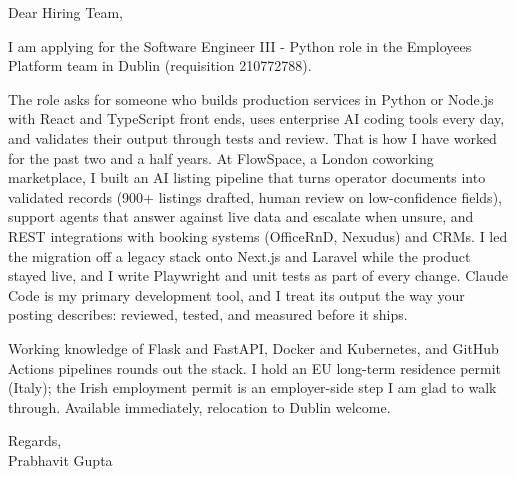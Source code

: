 \documentclass[a4paper,11pt]{article}
\begin{document}
Dear Hiring Team,

I am applying for the Software Engineer III - Python role in the Employees Platform team in Dublin (requisition 210772788).

The role asks for someone who builds production services in Python or Node.js with React and TypeScript front ends, uses enterprise AI coding tools every day, and validates their output through tests and review. That is how I have worked for the past two and a half years. At FlowSpace, a London coworking marketplace, I built an AI listing pipeline that turns operator documents into validated records (900+ listings drafted, human review on low-confidence fields), support agents that answer against live data and escalate when unsure, and REST integrations with booking systems (OfficeRnD, Nexudus) and CRMs. I led the migration off a legacy stack onto Next.js and Laravel while the product stayed live, and I write Playwright and unit tests as part of every change. Claude Code is my primary development tool, and I treat its output the way your posting describes: reviewed, tested, and measured before it ships.

Working knowledge of Flask and FastAPI, Docker and Kubernetes, and GitHub Actions pipelines rounds out the stack. I hold an EU long-term residence permit (Italy); the Irish employment permit is an employer-side step I am glad to walk through. Available immediately, relocation to Dublin welcome.

Regards,\\
Prabhavit Gupta
\end{document}
